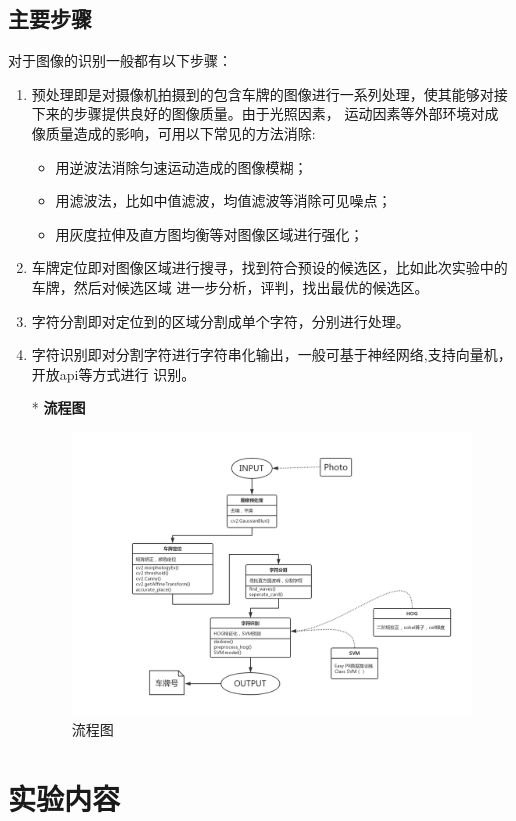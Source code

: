 \documentclass[UTF8,10pt,titlepage,a4paper]{ctexart}
\begin{document}
\subsection{主要步骤}
对于图像的识别一般都有以下步骤：
\begin{enumerate}
\item 预处理即是对摄像机拍摄到的包含车牌的图像进行一系列处理，使其能够对接下来的步骤提供良好的图像质量。由于光照因素，
运动因素等外部环境对成像质量造成的影响，可用以下常见的方法消除:
\begin{itemize}
  \item 用逆波法消除匀速运动造成的图像模糊；
  \item 用滤波法，比如中值滤波，均值滤波等消除可见噪点；
  \item 用灰度拉伸及直方图均衡等对图像区域进行强化；
\end{itemize}
\item 车牌定位即对图像区域进行搜寻，找到符合预设的候选区，比如此次实验中的车牌，然后对候选区域
进一步分析，评判，找出最优的候选区。
\item 字符分割即对定位到的区域分割成单个字符，分别进行处理。
\item 字符识别即对分割字符进行字符串化输出，一般可基于神经网络,支持向量机，开放api等方式进行
识别。
\end{enumerate}
\begin{itemize}
  \item[*] \textbf{流程图} \\
  \begin{figure}[h]
    \centering
    \includegraphics[width=.6\textwidth]{flow.jpg}
    \caption{流程图}
  \end{figure}  
\end{itemize}

\section{实验内容}
\end{document}
